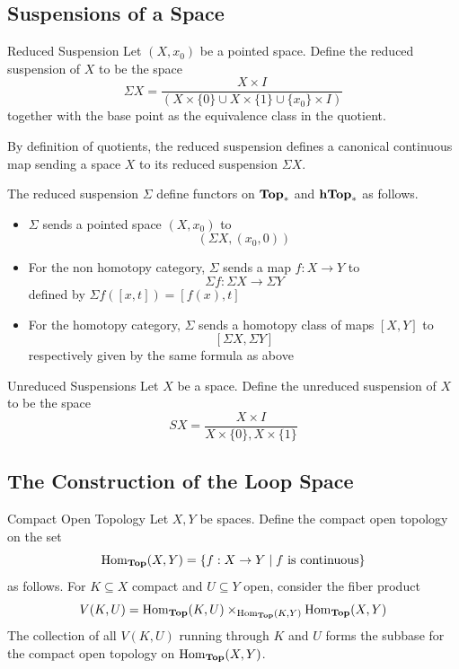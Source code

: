 \documentclass[a4paper]{article}
\begin{document}
\subsection{Suspensions of a Space}
\begin{defn}{Reduced Suspension}{} Let $(X,x_0)$ be a pointed space. Define the reduced suspension of $X$ to be the space $$\Sigma X=\frac{X\times I}{(X\times\{0\}\cup X\times\{1\}\cup\{x_0\}\times I)}$$ together with the base point as the equivalence class in the quotient. 
\end{defn}

By definition of quotients, the reduced suspension defines a canonical continuous map sending a space $X$ to its reduced suspension $\Sigma X$. 

\begin{thm}{}{} The reduced suspension $\Sigma$ define functors on $\bold{Top}_\ast$ and $\bold{hTop}_\ast$ as follows. 
\begin{itemize}
\item $\Sigma$ sends a pointed space $(X,x_0)$ to $$(\Sigma X,(x_0,0))$$
\item For the non homotopy category, $\Sigma$ sends a map $f:X\to Y$ to $$\Sigma f:\Sigma X\to\Sigma Y$$ defined by $\Sigma f([x,t])=[f(x),t]$
\item For the homotopy category, $\Sigma$ sends a homotopy class of maps $[X,Y]$ to $$[\Sigma X,\Sigma Y]$$ respectively given by the same formula as above
\end{itemize}
\end{thm}

\begin{defn}{Unreduced Suspensions}{} Let $X$ be a space. Define the unreduced suspension of $X$ to be the space $$SX=\frac{X\times I}{X\times\{0\},X\times\{1\}}$$
\end{defn}

\subsection{The Construction of the Loop Space}
\begin{defn}{Compact Open Topology}{} Let $X,Y$ be spaces. Define the compact open topology on the set $$\operatorname{Hom}_\bold{Top}(X,Y)=\{f:X\to Y\;|\;f\text{ is continuous}\}$$ as follows. For $K\subseteq X$ compact and $U\subseteq Y$ open, consider the fiber product $$V(K,U)=\operatorname{Hom}_\bold{Top}(K,U)\times_{\operatorname{Hom}_\bold{Top}(K,Y)}\operatorname{Hom}_\bold{Top}(X,Y)$$ The collection of all $V(K,U)$ running through $K$ and $U$ forms the subbase for the compact open topology on $\operatorname{Hom}_\bold{Top}(X,Y)$. 
\end{defn}
\end{document}
